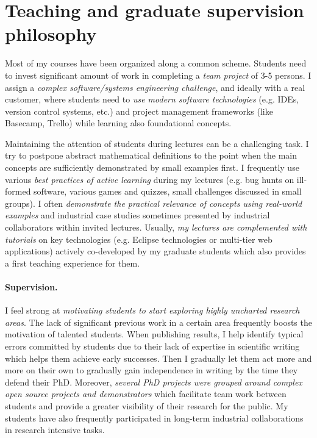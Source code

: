 \documentclass[a4paper,11pt]{article}
\begin{document}
\section{Teaching and graduate supervision philosophy}

Most of my courses have been organized along a common scheme. Students need to invest significant amount of work in completing a \emph{team project} of 3-5 persons. I assign a \emph{complex software/systems engineering challenge}, and ideally with a real customer, where students need to \emph{use modern software technologies} (e.g. IDEs, version control systems, etc.) and project management frameworks (like Basecamp, Trello) while learning also foundational concepts. 

Maintaining the attention of students during lectures can be a challenging task. I try to postpone abstract mathematical definitions to the point when the main concepts are sufficiently demonstrated by small examples first. I frequently use various \emph{best practices of active learning} during my lectures (e.g. bug hunts on ill-formed software, various games and quizzes, small challenges discussed in small groups). I often \emph{demonstrate the practical relevance of concepts using real-world examples} and industrial case studies sometimes presented by industrial collaborators within invited lectures. Usually, \emph{my lectures are complemented with tutorials} on key technologies (e.g. Eclipse technologies or multi-tier web applications) actively co-developed by my graduate students which also provides a first teaching experience for them. 

\paragraph{Supervision.} 
I feel strong at \emph{motivating students to start exploring highly uncharted research areas}. The lack of significant previous work in a certain area frequently boosts the motivation of talented students. When publishing results, I help identify typical errors committed by students due to their lack of expertise in scientific writing which helps them achieve early successes. Then I gradually let them act more and more on their own to gradually gain independence in writing by the time they defend their PhD. Moreover, \emph{several PhD projects were grouped around complex open source projects and demonstrators} which facilitate team work between students and provide a greater visibility of their research for the public. My students have also frequently participated in long-term industrial collaborations in research intensive tasks.


\end{document}
